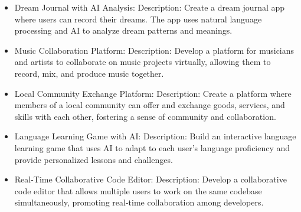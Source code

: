 \begin{itemize}
\item Dream Journal with AI Analysis: Description: Create a dream journal app where users can record their dreams. The app uses natural language processing and AI to analyze dream patterns and meanings.

\item Music Collaboration Platform: Description: Develop a platform for musicians and artists to collaborate on music projects virtually, allowing them to record, mix, and produce music together.

\item Local Community Exchange Platform: Description: Create a platform where members of a local community can offer and exchange goods, services, and skills with each other, fostering a sense of community and collaboration.

\item Language Learning Game with AI: Description: Build an interactive language learning game that uses AI to adapt to each user's language proficiency and provide personalized lessons and challenges.

\item Real-Time Collaborative Code Editor: Description: Develop a collaborative code editor that allows multiple users to work on the same codebase simultaneously, promoting real-time collaboration among developers.


\end{itemize}